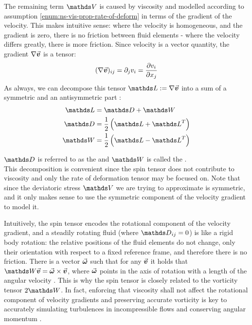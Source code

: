 The remaining term $\mat{V}$ is caused by viscosity and modelled according to assumption \ref{enum:ns-vis-prop-rate-of-deform} in terms of the gradient of the velocity. This makes intuitive sense: where the velocity is homogeneous, and the gradient is zero, there is no friction between fluid elements - where the velocity differs greatly, there is more friction. Since velocity is a vector quantity, the gradient $\nabla\vec{\bm{v}}$ is a tensor\autocite*{incompressible-flow-volker}:
\begin{equation}
    (\nabla \vec{\bm{v}})_{ij} = \partial_j v_i = \frac{\partial v_i}{\partial x_j}
\end{equation}
As always, we can decompose this tensor $\mat{L} := \nabla \vek{v} $ into a sum of a symmetric and an antisymmetric part \autocite*{continuum-intro}:
\begin{align}
    \mat{L} & = \mat{D} + \mat{W}                           \\
    \mat{D} & = \frac{1}{2}\left(\mat{L} + \mat{L}^T\right) \\
    \mat{W} & = \frac{1}{2}\left(\mat{L} - \mat{L}^T\right) \\
\end{align}

$\mat{D}$ is referred to as the  and $\mat{W}$ is called the .\\


This decomposition is convenient since the spin tensor does not contribute to viscosity  and only the rate of deformation tensor may be focused on. Note that since the deviatoric stress $\mat{V}$ we are trying to approximate is symmetric, and it only makes sense to use the symmetric component of the velocity gradient to model it.

Intuitively, the spin tensor encodes the rotational component of the velocity gradient, and a steadily rotating fluid (where $\mat{D}_{ij}=0$) is like a rigid body rotation: the relative positions of the fluid elements do not change, only their orientation with respect to a fixed reference frame, and therefore there is no friction. There is a vector $\vec{\bm{\omega}}$ such that for any $\vec{\bm{v}}$ it holds that $\mat{W}\vek{v} = \vek{\omega} \times \vek{v}$, where $\vec{\bm{\omega}}$ points in the axis of rotation with a length of the angular velocity \autocite*{continuum-intro}. This is why the spin tensor is closely related to the vorticity tensor $2\mat{W}$\autocite*{continuum-intro}. In fact, enforcing that viscosity shall not affect the rotational component of velocity gradients and preserving accurate vorticity is key to accurately simulating turbulences in incompressible flows and conserving angular momentum \autocite*{vorticity-micropolar}.

